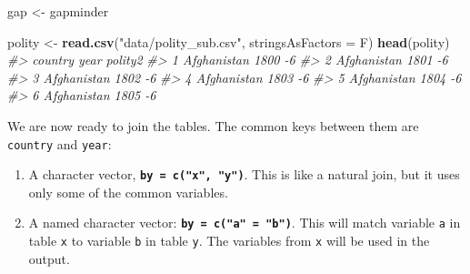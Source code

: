 \documentclass[
]{book}
\newenvironment{Shaded}{\begin{snugshade}}{\end{snugshade}}
\newcommand{\CommentTok}[1]{\textcolor[rgb]{0.56,0.35,0.01}{\textit{#1}}}
\newcommand{\DataTypeTok}[1]{\textcolor[rgb]{0.13,0.29,0.53}{#1}}
\newcommand{\KeywordTok}[1]{\textcolor[rgb]{0.13,0.29,0.53}{\textbf{#1}}}
\newcommand{\NormalTok}[1]{#1}
\newcommand{\OperatorTok}[1]{\textcolor[rgb]{0.81,0.36,0.00}{\textbf{#1}}}
\newcommand{\StringTok}[1]{\textcolor[rgb]{0.31,0.60,0.02}{#1}}
\begin{document}
\begin{Shaded}
\begin{Highlighting}[]
\NormalTok{gap <-}\StringTok{ }\NormalTok{gapminder}

\NormalTok{polity <-}\StringTok{ }\KeywordTok{read.csv}\NormalTok{(}\StringTok{"data/polity_sub.csv"}\NormalTok{, }\DataTypeTok{stringsAsFactors =}\NormalTok{ F)}
\KeywordTok{head}\NormalTok{(polity)}
\CommentTok{#>       country year polity2}
\CommentTok{#> 1 Afghanistan 1800      -6}
\CommentTok{#> 2 Afghanistan 1801      -6}
\CommentTok{#> 3 Afghanistan 1802      -6}
\CommentTok{#> 4 Afghanistan 1803      -6}
\CommentTok{#> 5 Afghanistan 1804      -6}
\CommentTok{#> 6 Afghanistan 1805      -6}
\end{Highlighting}
\end{Shaded}

We are now ready to join the tables. The common keys between them are \texttt{country} and \texttt{year}:

\begin{Shaded}
\end{Shaded}

\begin{enumerate}
\def\labelenumi{\arabic{enumi}.}
\setcounter{enumi}{1}
\item
  A character vector, \textbf{\texttt{by\ =\ c("x",\ "y")}}. This is like a natural join, but it uses only some of the common variables.
\item
  A named character vector: \textbf{\texttt{by\ =\ c("a"\ =\ "b")}}. This will match variable \texttt{a} in table \texttt{x} to variable \texttt{b} in table \texttt{y}. The variables from \texttt{x} will be used in the output.
\end{enumerate}
\end{document}
